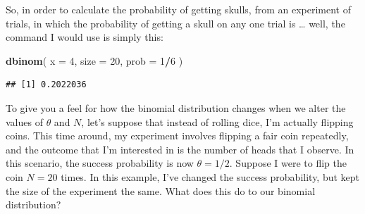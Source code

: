 \documentclass[
]{book}
\newenvironment{Shaded}{\begin{snugshade}}{\end{snugshade}}
\newcommand{\DataTypeTok}[1]{\textcolor[rgb]{0.13,0.29,0.53}{#1}}
\newcommand{\DecValTok}[1]{\textcolor[rgb]{0.00,0.00,0.81}{#1}}
\newcommand{\KeywordTok}[1]{\textcolor[rgb]{0.13,0.29,0.53}{\textbf{#1}}}
\newcommand{\NormalTok}[1]{#1}
\newcommand{\OperatorTok}[1]{\textcolor[rgb]{0.81,0.36,0.00}{\textbf{#1}}}
\begin{document}
So, in order to calculate the probability of getting skulls, from an experiment of trials, in which the probability of getting a skull on any one trial is \ldots{} well, the command I would use is simply this:

\begin{Shaded}
\begin{Highlighting}[]
\KeywordTok{dbinom}\NormalTok{( }\DataTypeTok{x =} \DecValTok{4}\NormalTok{, }\DataTypeTok{size =} \DecValTok{20}\NormalTok{, }\DataTypeTok{prob =} \DecValTok{1}\OperatorTok{/}\DecValTok{6}\NormalTok{ )}
\end{Highlighting}
\end{Shaded}

\begin{verbatim}
## [1] 0.2022036
\end{verbatim}

To give you a feel for how the binomial distribution changes when we alter the values of \(\theta\) and \(N\), let's suppose that instead of rolling dice, I'm actually flipping coins. This time around, my experiment involves flipping a fair coin repeatedly, and the outcome that I'm interested in is the number of heads that I observe. In this scenario, the success probability is now \(\theta = 1/2\). Suppose I were to flip the coin \(N=20\) times. In this example, I've changed the success probability, but kept the size of the experiment the same. What does this do to our binomial distribution?
\end{document}
